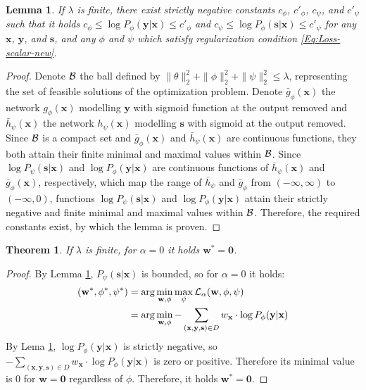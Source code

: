\documentclass[preprint,12pt]{elsarticle}
\newtheorem{theorem}{Theorem}
\newtheorem{lemma}{Lemma}
\begin{document}
\begin{lemma}
	If $\lambda$ is finite, there exist strictly negative constants
	$c_\phi$, $c'_\phi$, $c_\psi$, and $c'_\psi$ such that it holds
	$c_\phi\leq \log P_\phi(\mathbf{y}|\mathbf{x})\leq c'_\phi$ and
	$c_\psi\leq \log P_\phi(\mathbf{s}|\mathbf{x})\leq c'_\psi$ for
	any $\mathbf{x}$, $\mathbf{y}$, and $\mathbf{s}$, and any
	$\phi$ and $\psi$ which satisfy regularization condition \ref{Eq:Loss-scalar-new}.
	\label{pp:bounded}
\end{lemma}
\begin{proof}
	Denote ${\cal B}$ the ball defined by $\|\theta\|^2_2+\|\phi\|^2_2+\|\psi\|^2_2\leq \lambda$, representing the set of feasible solutions of the optimization problem.
	Denote $\bar{g}_\phi(\mathbf{x})$ the network $g_\phi(\mathbf{x})$ modelling $\mathbf{y}$ with sigmoid function at the output removed and $\bar{h}_\psi(\mathbf{x})$ the network $h_\psi(\mathbf{x})$ modelling $\mathbf{s}$ with sigmoid at the output removed. Since ${\cal B}$ is a compact set and $\bar{g}_\phi(\mathbf{x})$ and $\bar{h}_\psi(\mathbf{x})$ are continuous functions, they both attain their finite minimal and maximal values within ${\cal B}$. Since $\log P_\psi(\mathbf{s}|\mathbf{x})$ and $\log P_\phi(\mathbf{y}|\mathbf{x})$ are continuous functions of  $\bar{h}_\psi(\mathbf{x})$ and $\bar{g}_\phi(\mathbf{x})$, respectively, which map the range of $\bar{h}_\psi$ and $\bar{g}_\phi$ from $(-\infty,\infty)$ to $(-\infty, 0)$, functions $\log P_\psi(\mathbf{s}|\mathbf{x})$ and $\log P_\phi(\mathbf{y}|\mathbf{x})$ attain their strictly negative and finite minimal and maximal values within ${\cal B}$. Therefore, the required constants exist, by which the lemma is proven.
\end{proof}

\begin{theorem}
	If $\lambda$ is finite, for $\alpha=0$ it holds $\mathbf{w}^*=\mathbf{0}$.
	\label{pp:zero}
\end{theorem}
\begin{proof}
	By Lemma \ref{pp:bounded}, $P_{\psi}(\mathbf{s}|\mathbf{x})$ is bounded, so for $\alpha=0$ it holds:
	\begin{align}
	\begin{split}
	(\mathbf{w}^*,\phi^*,\psi^*)&=\arg\min_{\mathbf{w},\phi}\max_{\psi}{\cal L}_\alpha(\mathbf{w},\phi,\psi)\\
	&=\arg\min_{\mathbf{w},\phi}- \sum_{(\mathbf{x},\mathbf{y},\mathbf{s})\in D} w_\mathbf{x} \cdot \log P_{\phi}(\mathbf{y}|\mathbf{x})
	\end{split}
	\end{align}
	By Lema \ref{pp:bounded}, $\log P_{\phi}(\mathbf{y}|\mathbf{x})$ is strictly negative, so $- \sum_{(\mathbf{x},\mathbf{y},\mathbf{s})\in D} w_\mathbf{x} \cdot \log P_{\phi}(\mathbf{y}|\mathbf{x})$ is zero or positive. Therefore its minimal value is $0$ for $\mathbf{w}=\mathbf{0}$ regardless of $\phi$.
	Therefore, it holds $\mathbf{w}^*=\mathbf{0}$.
\end{proof}
\end{document}
